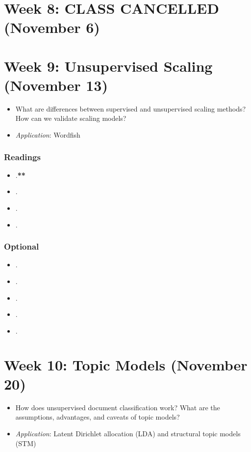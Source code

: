 \documentclass[abstract=on,parskip=full,headings=standardclasses,fontsize=11pt,paper=a4]{scrartcl}
\begin{document}
\section{Week 8: CLASS CANCELLED (November 6)}


\section{Week 9: Unsupervised Scaling (November 13)}

\begin{itemize}
\renewcommand\labelitemi{--}
\item What are differences between supervised and unsupervised scaling methods? How can we validate scaling models?
\item \textit{Application}: Wordfish
\end{itemize}

\subsubsection*{Readings}
\begin{itemize}
\item {}.\textbf{**}
\item {}.
\item {}.
\item {}.
\end{itemize}

\subsubsection*{Optional}
\begin{itemize}
\item {}.
\item {}.
\item {}.
\item {}.
\item {}.
\end{itemize}


\section{Week 10: Topic Models (November 20)}

\begin{itemize}
\renewcommand\labelitemi{--}
\item How does unsupervised document classification work? What are the assumptions, advantages, and caveats of topic models? 
\item \textit{Application}: Latent Dirichlet allocation (LDA) and structural topic models (STM)
\end{itemize}
\end{document}
